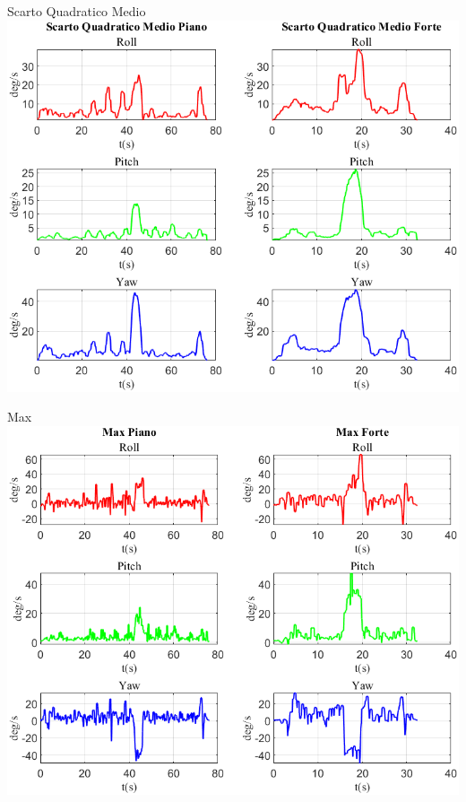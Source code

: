	\begin{frame}{{Scarto Quadratico Medio}}
		\centering\includegraphics[height=.8\textheight]{figure/VAng/Scarto Quadratico Medio}
	\end{frame}
	
	\begin{frame}{{Max}}
		\centering\includegraphics[height=.8\textheight]{figure/VAng/Max}
	\end{frame}
	
